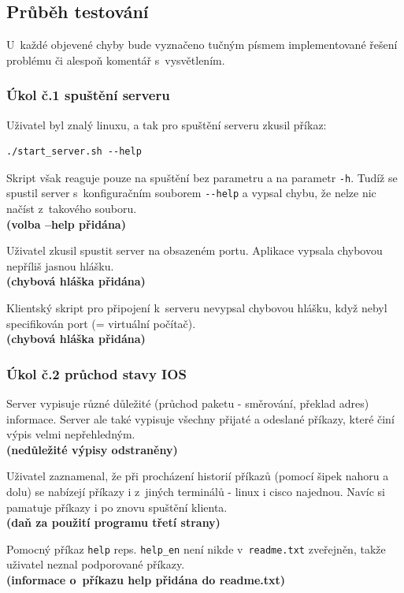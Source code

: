 \subsection{Průběh testování}
U~každé objevené chyby bude vyznačeno tučným písmem implementované řešení problému či alespoň komentář s~vysvětlením. 

\subsubsection{Úkol č.1 spuštění serveru}
Uživatel byl znalý linuxu, a tak pro spuštění serveru zkusil příkaz:
\begin{verbatim}
./start_server.sh --help
\end{verbatim}
Skript však reaguje pouze na spuštění bez parametru a na parametr \verb|-h|. Tudíž se spustil server s~konfiguračním souborem \verb|--help| a vypsal chybu, že nelze nic načíst z~takového souboru.
\\\textbf{(volba --help přidána)}

Uživatel zkusil spustit server na obsazeném portu. Aplikace vypsala chybovou nepříliš jasnou hlášku.
\\\textbf{(chybová hláška přidána)}

Klientský skript pro připojení k~serveru nevypsal chybovou hlášku, když nebyl specifikován port (= virtuální počítač).
\\\textbf{(chybová hláška přidána)}

\subsubsection{Úkol č.2 průchod stavy IOS}
Server vypisuje různé důležité (průchod paketu - směrování, překlad adres) informace. Server ale také vypisuje všechny přijaté a odeslané příkazy, které činí výpis velmi nepřehledným.
\\\textbf{(nedůležité výpisy odstraněny)}

Uživatel zaznamenal, že při procházení historií příkazů (pomocí šipek nahoru a dolu) se nabízejí příkazy i z~jiných terminálů - linux i cisco najednou. Navíc si pamatuje příkazy i po znovu spuštění klienta.
\\\textbf{(daň za použití programu třetí strany)}

Pomocný příkaz \verb|help| reps. \verb|help_en| není nikde v~\verb|readme.txt| zveřejněn, takže uživatel neznal podporované příkazy.
\\\textbf{(informace o~příkazu help přidána do readme.txt)}


